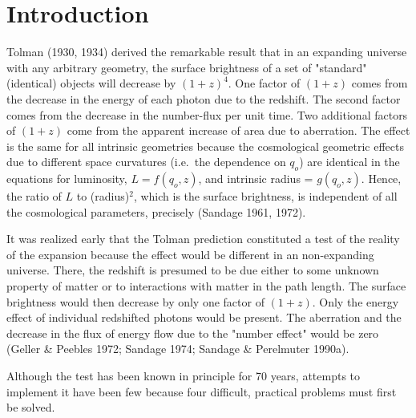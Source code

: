 \documentclass[preprint]{aastex}
\begin{document}

\section{Introduction}

Tolman (1930, 1934) derived the remarkable result that in an expanding
universe with any arbitrary geometry, the surface brightness of a set
of "standard" (identical) objects will decrease by $(1 + z)^4$. One
factor of $(1 + z)$ comes from the decrease in the energy of each
photon due to the redshift. The second factor comes from the decrease
in the number-flux per unit time. Two additional factors of $(1 + z)$
come from the apparent increase of area due to aberration. The effect
is the same for all intrinsic geometries because the cosmological
geometric effects due to different space curvatures (i.e.\ the
dependence on $q_o$) are identical in the equations for luminosity, $L
= f(q_o, z)$, and intrinsic radius = $g(q_o, z)$.  Hence, the ratio of
$L$ to (radius)$^2$, which is the surface brightness, is independent
of all the cosmological parameters, precisely (Sandage 1961, 1972).

It was realized early that the Tolman prediction constituted a test of
the reality of the expansion because the effect would be different in
an non-expanding universe. There, the redshift is presumed to be due
either to some unknown property of matter or to interactions with
matter in the path length. The surface brightness would then decrease
by only one factor of $(1 + z)$.  Only the energy effect of individual
redshifted photons would be present. The aberration and the decrease
in the flux of energy flow due to the "number effect" would be zero
(Geller \& Peebles 1972; Sandage 1974; Sandage \& Perelmuter 1990a).

Although the test has been known in principle for 70 years, attempts
to implement it have been few because four difficult, practical
problems must first be solved.

 
\end{document}
